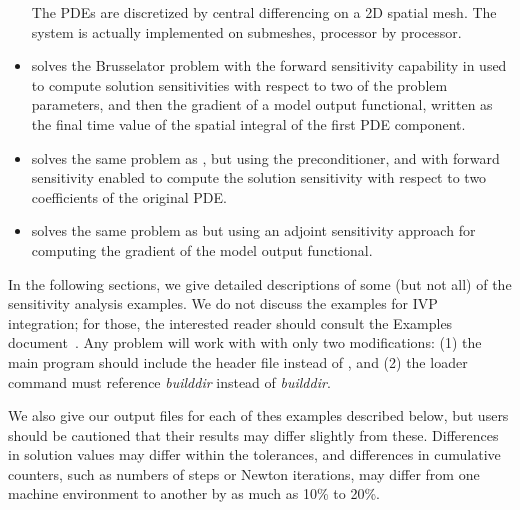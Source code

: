 \begin{itemize}
  The PDEs are discretized by central differencing on a 2D spatial mesh.
  The system is actually implemented on submeshes, processor by processor.


\item {}
  solves the Brusselator problem with the forward sensitivity capability in {\idas}
  used to compute solution sensitivities with respect to two of the problem 
  parameters, and then the gradient of a model output functional, written as
  the final time value of the spatial integral of the first PDE component.

\item {}
  solves the same problem as , but using the {\idabbdpre}
  preconditioner, and with forward sensitivity enabled to compute the solution
  sensitivity with respect to two coefficients of the original PDE.
  

\item {}
  solves the same problem as  but using an adjoint
  sensitivity approach for computing the gradient of the model output functional.

\end{itemize}


\vspace{0.2in}\noindent
In the following sections, we give detailed descriptions of some (but
not all) of the sensitivity analysis examples. We do not discuss the 
examples for IVP integration; for those, the interested reader should consult
the {\ida} Examples document~\cite{ida_ex}. Any {\ida} problem
will work with {\idas} with only two modifications: (1) the main program
should include the header file  instead of , and
(2) the loader command must reference
{\em builddir} instead of
{\em builddir}.

We also give our output files for each of thes examples described below,
but users should be cautioned that their results may differ slightly from these.
Differences in solution values may differ within the tolerances, and differences
in cumulative counters, such as numbers of steps or Newton iterations, may differ
from one machine environment to another by as much as 10\% to 20\%.

